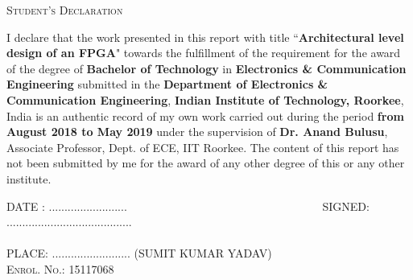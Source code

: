 %
%
%
%
%
%
\noindent \hfill \textsc{\Large Student's Declaration}\\
\noindent\makebox[\linewidth]{\rule{\textwidth}{1pt}} 
\begin{SingleSpacing}
\vspace{-5mm}
I declare that the work presented in this report with title ``\textbf{Architectural level design of an FPGA}" towards the fulfillment of the requirement for the award of the degree of \textbf{Bachelor of Technology} in \textbf{Electronics \& Communication Engineering} submitted in the \textbf{Department of Electronics \& Communication Engineering}, \textbf{Indian Institute of Technology, Roorkee}, India is an authentic record of my own work carried out during the period \textbf{from August 2018 to May 2019} under the supervision of \textbf{Dr. Anand Bulusu}, Associate Professor, Dept. of ECE, IIT Roorkee.
\noindent The content of this report has not been submitted by me for the award of any other degree of this or any other institute.

\vspace{3cm}
\noindent
\textsc{DATE : ......................... ~~~~~~~~~~~~~~~~~~~~~~~~~~~~~~~~~~SIGNED: ........................................}\\\\
\textsc{PLACE: .........................}
\nobreak
\hfill \textsc{(SUMIT KUMAR YADAV)} \\
\vspace{-4 mm}
\nobreak
\hfill \textsc{Enrol. No.: 15117068}


\end{SingleSpacing}
\clearpage 
